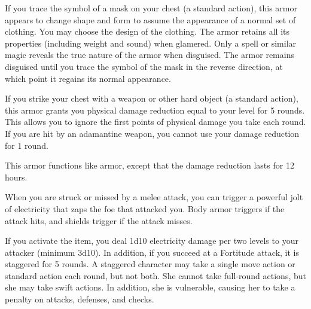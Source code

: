 
 If you trace the symbol of a mask on your chest (a standard action), this armor appears to change shape and form to assume the appearance of a normal set of clothing. You may choose the design of the clothing. The armor retains all its properties (including weight and sound) when glamered. Only a  spell or similar magic reveals the true nature of the armor when disguised. The armor remains disguised until you trace the symbol of the mask in the reverse direction, at which point it regains its normal appearance. 


 If you strike your chest with a weapon or other hard object (a standard action), this armor grants you physical damage reduction equal to your level for 5 rounds. This allows you to ignore the first points of physical damage you take each round. If you are hit by an adamantine weapon, you cannot use your damage reduction for 1 round.


 This armor functions like  armor, except that the damage reduction lasts for 12 hours.


 When you are struck or missed by a melee attack, you can trigger a powerful jolt of electricity that zaps the foe that attacked you. Body armor triggers if the attack hits, and shields trigger if the attack misses.

If you activate the item, you deal 1d10 electricity damage per two levels to your attacker (minimum 3d10). In addition, if you succeed at a Fortitude attack, it is staggered for 5 rounds. A staggered character may take a single move action or standard action each round, but not both. She cannot take full-round actions, but she may take swift actions. In addition, she is vulnerable, causing her to take a  penalty on attacks, defenses, and checks.

